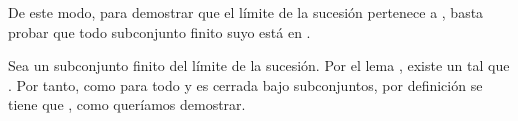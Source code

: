 \begin{isabellebody}
\begin{isamarkuptext}
\begin{demostracion}
    De este modo, para demostrar que el límite de la sucesión  pertenece a , basta probar
    que todo subconjunto finito suyo está en .

    Sea  un subconjunto finito del límite de la sucesión. Por el lema , existe un
     tal que . Por tanto, como  para todo  y  es cerrada bajo
    subconjuntos, por definición se tiene que , como queríamos demostrar.
  \end{demostracion}


\end{isamarkuptext}
\end{isabellebody}

